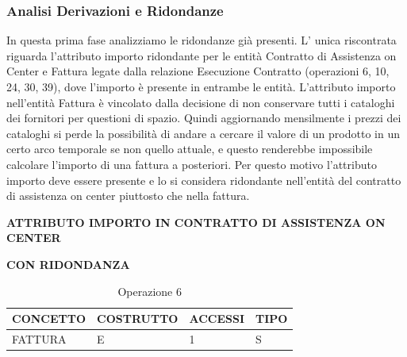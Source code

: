 
\subsubsection{Analisi Derivazioni e Ridondanze}
In questa prima fase analizziamo le ridondanze già presenti. L' unica riscontrata riguarda l'attributo importo ridondante per le entità Contratto di Assistenza on Center e Fattura legate dalla relazione Esecuzione Contratto (operazioni 6, 10, 24, 30, 39), dove l'importo è presente in entrambe le entità.
L'attributo importo nell'entità Fattura è vincolato dalla decisione di non conservare tutti i cataloghi dei fornitori per questioni di spazio. Quindi aggiornando mensilmente i prezzi dei cataloghi si perde la possibilità di andare a cercare il valore di un prodotto in un certo arco temporale se non quello attuale, e questo renderebbe impossibile calcolare l'importo di una fattura a posteriori. Per questo motivo l'attributo importo deve essere presente e lo si considera ridondante nell'entità del contratto di assistenza on center piuttosto che nella fattura.
\newline\newline
\centerline{\textbf{ATTRIBUTO IMPORTO IN CONTRATTO DI ASSISTENZA ON CENTER}}
\newline
\centerline{\textbf{CON RIDONDANZA}}
\begin{table}[H]
\centering
\caption{Operazione 6}
\begin{tabular}{llll}
\\ \hline
\multicolumn{1}{|l|}{\textbf{CONCETTO}} & \multicolumn{1}{l|}{\textbf{COSTRUTTO}} & \multicolumn{1}{l|}{\textbf{ACCESSI}} & \multicolumn{1}{l|}{\textbf{TIPO}} \\ \hline
\multicolumn{1}{|l|}{FATTURA}
& \multicolumn{1}{l|}{E}                  & \multicolumn{1}{l|}{1}                & \multicolumn{1}{l|}{S}             \\ \hline
\end{tabular}
\end{table}


